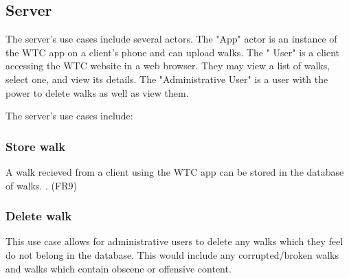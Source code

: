 \documentclass{project}
\begin{document}
\subsection{Server}
\begin{figure}[H]
\end{figure}

The server's use cases include several actors. \newline
The "App" actor is an instance of the WTC app on a client's phone and can upload walks. \newline
The "
User" is a client accessing the WTC website in a web browser. 
They may view a list of walks, select one, and view its details.\newline
The "Administrative User" is a user with the power to delete walks as well as view them.\newline
\bigskip

The server's use cases include: 

\subsubsection{Store walk}
A walk recieved from a client using the WTC app can be stored in the database of walks. . (FR9)

\subsubsection{Delete walk}
This use case allows for administrative users to delete any walks which they feel do not belong in the database.
This would include any corrupted/broken walks and walks which contain obscene or offensive content. 
 
\end{document}
